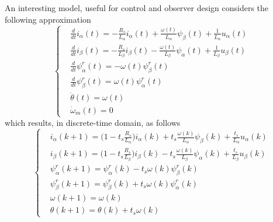 \documentclass[11pt,a4paper,oneside]{book}
\numberwithin{equation}{section}
\theoremstyle{it}
\theoremstyle{definition}
\begin{document}
\begin{mybox}
	An interesting model, useful for control and observer design considers the following approximation
		\begin{equation}\label{reduced}
		\left\lbrace \begin{aligned}
			& \frac{d}{dt} i_\alpha(t)= -\frac{R_s}{L_\alpha}i_\alpha(t) 
			+\frac{\omega(t)}{L_\alpha}\psi_\beta(t)+\frac{1}{L_\alpha}u_\alpha(t)
			\\[6pt]
			& \frac{d}{dt} i_\beta(t)= -\frac{R_s}{L_\beta}i_\beta(t) 
			-\frac{\omega(t)}{L_\beta}\psi_\alpha(t)+\frac{1}{L_\beta}u_\beta(t)
			\\[6pt]
			&\frac{d}{dt} \psi_\alpha^r(t) = -\omega(t)\psi_\beta^r(t) \\[6pt]
			&\frac{d}{dt} \psi_\beta^r(t) = \omega(t)\psi_\alpha^r(t) \\[6pt]
			& \dot{\theta}(t) = \omega(t) \\[6pt]
			& \dot{\omega}_m(t) = 0 
		\end{aligned} \right. 
	\end{equation}
	which results, in discrete-time domain, as follows
	\begin{equation}\label{twophase_model_ref_ab_dt_splitted}
		\left\lbrace \begin{aligned}
			& i_\alpha(k+1)=\Big(1-t_s\frac{R_s}{L_\alpha}\Big) i_\alpha(k) 
			+t_s\frac{\omega(k)}{L_\alpha}\psi_\beta(k)+\frac{t_s}{L_\alpha}u_\alpha(k)
			 \\[6pt]
			& i_\beta(k+1) = \Big(1-t_s\frac{R_s}{L_\beta}\Big)i_\beta(k) 
			-t_s\frac{\omega(k)}{L_\beta}\psi_\alpha(k)+\frac{t_s}{L_\beta}u_\beta(k)
			 \\[6pt]
			&\psi_\alpha^r(k+1) = \psi_\alpha^r(k) -t_s\omega(k)\psi_\beta^r(k) 
			\\[6pt]
			&\psi_\beta^r(k+1) = \psi_\beta^r(k) + t_s\omega(k)\psi_\alpha^r(k) 
			\\[6pt]
			& \omega(k+1) = \omega(k) \\[6pt]
			& \theta(k+1) = \theta(k) + t_s\omega(k)
		\end{aligned} \right. 
	\end{equation}
\end{mybox}
\end{document}
